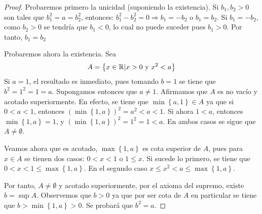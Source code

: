 \documentclass[12pt]{article}
\begin{document}
\begin{enumerate}
    \begin{proof}
        Probaremos primero la unicidad (suponiendo la existencia). Si $b_1,b_2>0$ son tales que $b_1^2=a=b_2^2$, entonces: $b_1^2-b_2^2=0\Rightarrow b_1 = -b_2$ o $b_1 = b_2$. Si $b_1 = -b_2$, como $b_2 > 0$ se tendría que $b_1 < 0$, lo cual no puede suceder pues $b_1 > 0$. Por tanto, $b_1 = b_2$

        Probaremos ahora la existencia. Sea
        \begin{equation*}
            A = \left\{x\in\mathbb{R}|x > 0 \textup{ y } x^2< a\right\}
        \end{equation*}
        Si $a=1$, el resultado es inmediato, pues tomando $b=1$ se tiene que $b^2=1^2=1=a$.
        Supongamos entonces que $a\neq 1$. Afirmamos que $A$ es no vacío y acotado superiormente. En efecto, se tiene que $\min\left\{a,1\right\}\in A$ ya que si $0<a<1$, entonces $\left(\min\left\{1,a\right\}\right)^2=a^2<a<1$.
        Si ahora $1 < a$, entonces $\min\left\{1,a\right\}=1$, y $\left(\min\left\{1,a\right\}\right)^2=1^2=1<a$. En ambos casos se sigue que $A\neq\emptyset$.
        
        Veamos ahora que es acotado, $\max\left\{1,a\right\}$ es cota superior de $A$, pues para $x\in A$ se tienen dos casos: $0<x<1$ o $1\leq x$. Si sucede lo primero, se tiene que $0<x<1\leq \max\left\{1,a\right\}$. En el segundo caso $x\leq x^2<a\leq \max\left\{1,a\right\}$.
        
        Por tanto, $A\neq\emptyset$ y acotado superiormente, por el axioma del supremo, existe $b=\sup A$. Observemos que $b>0$ ya que por ser cota de $A$ en particular se tiene que $b>\min\left\{1,a\right\}>0$. Se probará que $b^2=a$.
        

\end{proof}
\end{enumerate}
\end{document}
